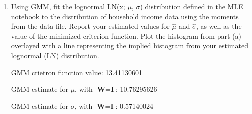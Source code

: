 \documentclass[letterpaper,12pt]{article}
\theoremstyle{definition}
\begin{document}
\begin{enumerate}
\begin{enumerate}
\item Using GMM, fit the lognormal LN(x; $\mu$, $\sigma$) distribution defined in the MLE notebook to the distribution of household income data using the moments from the data file. Report your estimated values for $\hat{\mu}$ and $\hat{\sigma}$, as well as the value of the minimized criterion function. Plot the histogram from part (a) overlayed with a line representing the implied histogram from your estimated lognormal (LN) distribution.
\par
\begin{figure}[H]\centering\captionsetup{width=4.0in}
\end{figure}
\par
GMM crietron function value: 13.41130601 \par
GMM estimate for $\mu$, with $\textbf{W} = \textbf{I}$: 10.76295626\par
GMM estimate for $\sigma$, with $\textbf{W} = \textbf{I}$: 0.57140024 \par
\bigskip


\end{enumerate}
\end{enumerate}
\end{document}
